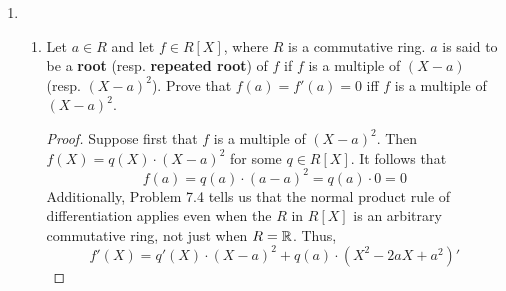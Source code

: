 \documentclass[../psets.tex]{subfiles}
\begin{document}
\begin{enumerate}
\begin{proof}
\begin{align*}
            ={}& \sum_{r=1}^{m+n}\left( ra_0b_r+\sum_{p=1}^{r-1}(r-p)a_pb_{r-p}+\sum_{p=1}^{r-1}pa_pb_{r-p}+ra_rb_0 \right)X^{r-1}\\
            ={}& \sum_{r=1}^{m+n}\left( ra_0b_r+\sum_{p=1}^{r-1}ra_pb_{r-p}+ra_rb_0 \right)X^{r-1}\\
            ={}& \sum_{r=1}^{m+n}r\left( a_0b_r+\sum_{p=1}^{r-1}a_pb_{r-p}+a_rb_0 \right)X^{r-1}\\
            ={}& \sum_{r=1}^{m+n}r\left( \sum_{p=0}^ra_pb_{r-p} \right)X^{r-1}\\
            ={}& \left[ \sum_{r=0}^{m+n}\left( \sum_{p=0}^ra_pb_{r-p} \right)X^r \right]'\\
            ={}& (ab)'\\
            ={}& D(ab)
        \end{align*}
        as desired.\par
        \underline{Property 3}: Let $c\in R$ be arbitrary. Then
        \begin{equation*}
            D(c) = c' = 0
        \end{equation*}
        as desired.\par
        Lastly, we have by that
        \begin{equation*}
            D(X) = X' = 1
        \end{equation*}
        as desired.
    \end{proof}
    \item 
    \begin{enumerate}
        \item Let $a\in R$ and let $f\in R[X]$, where $R$ is a commutative ring. $a$ is said to be a \textbf{root} (resp. \textbf{repeated root}) of $f$ if $f$ is a multiple of $(X-a)$ (resp. $(X-a)^2$). Prove that $f(a)=f'(a)=0$ iff $f$ is a multiple of $(X-a)^2$.
        \begin{proof}
            Suppose first that $f$ is a multiple of $(X-a)^2$. Then $f(X)=q(X)\cdot(X-a)^2$ for some $q\in R[X]$. It follows that
            \begin{equation*}
                f(a) = q(a)\cdot(a-a)^2
                = q(a)\cdot 0
                = 0
            \end{equation*}
            Additionally, Problem 7.4 tells us that the normal product rule of differentiation applies even when the $R$ in $R[X]$ is an arbitrary commutative ring, not just when $R=\mathbb{R}$. Thus,
            \begin{equation*}
                f'(X) = q'(X)\cdot(X-a)^2+q(a)\cdot(X^2-2aX+a^2)'

\end{equation*}
\end{proof}
\end{enumerate}
\end{enumerate}
\end{document}
